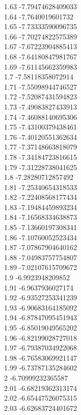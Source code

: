 {1.63	-7.79474628409033\\
1.64	-7.7640019601732\\
1.65	-7.73333590096735\\
1.66	-7.70274822575389\\
1.67	-7.67223904885413\\
1.68	-7.64180847981767\\
1.69	-7.61145662359983\\
1.7	-7.58118358072914\\
1.71	-7.55098944746527\\
1.72	-7.52087431594823\\
1.73	-7.49083827433913\\
1.74	-7.46088140695306\\
1.75	-7.43100379438461\\
1.76	-7.40120551362634\\
1.77	-7.37148663818079\\
1.78	-7.34184723816615\\
1.79	-7.31228738041625\\
1.8	-7.28280712857492\\
1.81	-7.25340654318533\\
1.82	-7.22408568177434\\
1.83	-7.19484459893234\\
1.84	-7.16568334638873\\
1.85	-7.13660197308341\\
1.86	-7.10760052523434\\
1.87	-7.07867904640162\\
1.88	-7.04983757754807\\
1.89	-7.02107615709672\\
1.9	-6.9923948209852\\
1.91	-6.9637936027174\\
1.92	-6.93527253341239\\
1.93	-6.90683164185092\\
1.94	-6.87847095451943\\
1.95	-6.85019049565202\\
1.96	-6.82199028727018\\
1.97	-6.79387034922068\\
1.98	-6.76583069921147\\
1.99	-6.73787135284602\\
2	-6.70999232365587\\
2.01	-6.68219362313174\\
2.02	-6.65447526075315\\
2.03	-6.62683724401672\\
}
